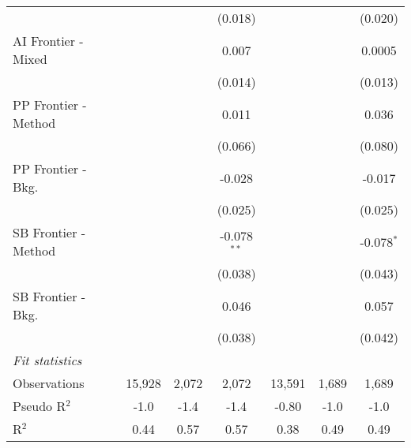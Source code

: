 \begin{tabular}{lcccccc}
                        &             &              & (0.018)       &              &          & (0.020)\\   
   AI Frontier - Mixed  &             &              & 0.007         &              &          & 0.0005\\   
                        &             &              & (0.014)       &              &          & (0.013)\\   
   PP Frontier - Method &             &              & 0.011         &              &          & 0.036\\   
                        &             &              & (0.066)       &              &          & (0.080)\\   
   PP Frontier - Bkg.   &             &              & -0.028        &              &          & -0.017\\   
                        &             &              & (0.025)       &              &          & (0.025)\\   
   SB Frontier - Method &             &              & -0.078$^{**}$ &              &          & -0.078$^{*}$\\   
                        &             &              & (0.038)       &              &          & (0.043)\\   
   SB Frontier - Bkg.   &             &              & 0.046         &              &          & 0.057\\   
                        &             &              & (0.038)       &              &          & (0.042)\\   
   \midrule
   \emph{Fit statistics}\\
   Observations         & 15,928      & 2,072        & 2,072         & 13,591       & 1,689    & 1,689\\  
   Pseudo R$^2$         & -1.0        & -1.4         & -1.4          & -0.80        & -1.0     & -1.0\\  
   R$^2$                & 0.44        & 0.57         & 0.57          & 0.38         & 0.49     & 0.49\\  
   

\end{tabular}
